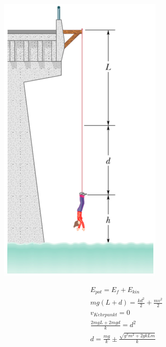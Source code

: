 \documentclass[
a4paper,
oneside,
landscape, 
8pt,
]{scrartcl}
\begin{document}
\begin{multicols*}{2}
\begin{minipage}[h!]{0.2\linewidth}
\includegraphics[width=\linewidth]{images/energie}
\end{minipage}
\hfill
\begin{minipage}[h!]{0.3\linewidth}
	\begin{align*}
	E_{pot} = E_f + E_{kin} \\
	m g (L + d) = \frac{kd^2}{2}  + \frac{m v^2}{2}  \\
	v_{Kehrpunkt} = 0 \\
	\frac{2mgL + 2mgd}{k} = d^2 \\
	d = \frac{m g}{k} \pm \frac{\sqrt{g^2 m^2 + 2 g k L m}}{k} \\
	\end{align*}
\end{minipage}


\end{multicols*}
\end{document}
